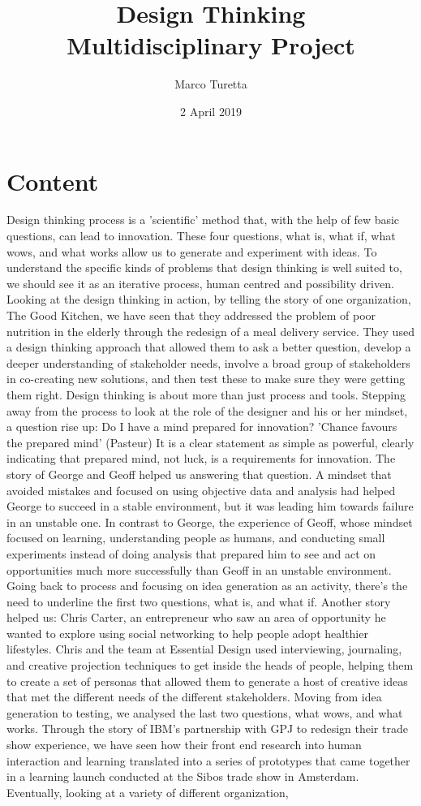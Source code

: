 \documentclass[a4paper,9pt]{article}
\title{\textbf{ Design Thinking} \\
        \large Multidisciplinary Project}
\author{Marco Turetta}
\date{2 April 2019}
\begin{document}
\maketitle

\section{Content}
Design thinking process is a 'scientific' method that, with the help of few basic questions, can lead to innovation. These four questions, what is, what if, what wows, and what works allow us to generate and experiment with ideas. To understand the specific kinds of problems that design thinking is well suited to, we should see it as an iterative process, human centred and possibility driven. Looking at the design thinking in action, by telling the story of one organization, The Good Kitchen, we have seen that they addressed the problem of poor nutrition in the elderly through the redesign of a meal delivery service. They used a design thinking approach that allowed them to ask a better question, develop a deeper understanding of stakeholder needs, involve a broad group of stakeholders in co-creating new solutions, and then test these to make sure they were getting them right. Design thinking is about more than just process and tools. Stepping away from the process to look at the role of the designer and his or her mindset, a question rise up: Do I have a mind prepared for innovation? 'Chance favours the prepared mind' (Pasteur) It is a clear statement  as simple as powerful, clearly indicating that prepared mind, not luck, is a requirements for innovation. The story of George and Geoff helped us answering that question. A mindset that avoided mistakes and focused on using objective data and analysis had helped George to succeed in a stable environment, but it was leading him towards failure in an unstable one. In contrast to George, the experience of Geoff, whose mindset focused on learning, understanding people as humans, and conducting small experiments instead of doing analysis that prepared him to see and act on opportunities much more successfully than Geoff in an unstable environment. Going back to process and focusing on idea generation as an activity, there's the need to underline the first two questions, what is, and what if. Another story helped us: Chris Carter, an entrepreneur who saw an area of opportunity he wanted to explore using social networking to help people adopt healthier lifestyles. Chris and the team at Essential Design used interviewing, journaling, and creative projection techniques to get inside the heads of people, helping them to create a set of personas that allowed them to generate a host of creative ideas that met the different needs of the different stakeholders. Moving from idea generation to testing, we analysed the last two questions, what wows, and what works. Through the story of IBM's partnership with GPJ to redesign their trade show experience, we have seen how their front end research into human interaction and learning translated into a series of prototypes that came together in a learning launch conducted at the Sibos trade show in Amsterdam. Eventually, looking at a variety of different organization, 
\end{document}

